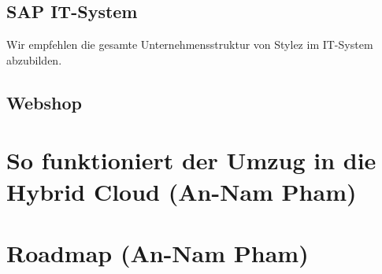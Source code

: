 \subsection{SAP IT-System}
Wir empfehlen die gesamte Unternehmensstruktur von Stylez im IT-System abzubilden.
\subsection{Webshop}
\section{So funktioniert der Umzug in die Hybrid Cloud (An-Nam Pham)}
\section{Roadmap (An-Nam Pham)}
